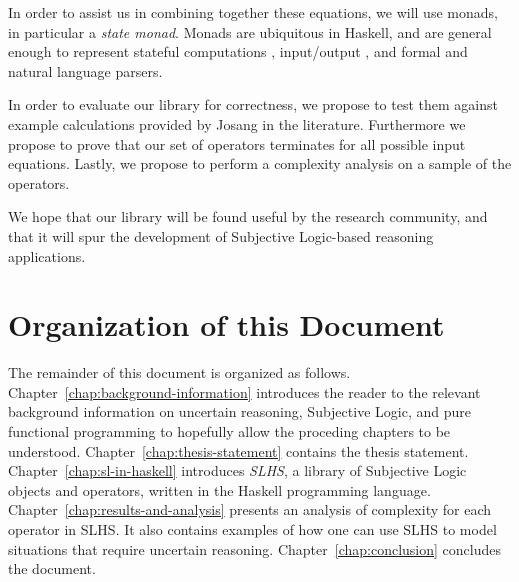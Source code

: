 \documentclass[thesis.tex]{subfiles}
\begin{document}
In order to assist us in combining together these equations, we will use monads,
in particular a \emph{state monad}. Monads are ubiquitous in Haskell, and are
general enough to represent stateful computations \cite{launchbury1994lazy},
input/output \cite{peyton1993imperative},
and formal \cite{hutton1998monadic, leijen2001parsec} and natural language
\cite{hafiz2010lazy} parsers.

In order to evaluate our library for correctness, we propose to test them against
example calculations provided by Josang in the literature. Furthermore we propose
to prove that our set of operators terminates for all possible input equations.
Lastly, we propose to perform a complexity analysis on a sample of the operators.

We hope that our library will be found useful by the research community, and that
it will spur the development of Subjective Logic-based reasoning applications.






\section{Organization of this Document}

The remainder of this document is organized as follows.
Chapter~\ref{chap:background-information}
introduces the reader to the relevant background information on uncertain reasoning,
Subjective Logic, and pure functional programming to hopefully allow the proceding
chapters to be understood. Chapter~\ref{chap:thesis-statement} contains the thesis
statement. Chapter~\ref{chap:sl-in-haskell} introduces \emph{SLHS}, a library of
Subjective Logic objects and operators, written in the Haskell programming language.
Chapter~\ref{chap:results-and-analysis} presents an analysis of complexity for each
operator in SLHS. It also contains examples of how one can use SLHS to model situations
that require uncertain reasoning. Chapter~\ref{chap:conclusion} concludes the document.
\end{document}
